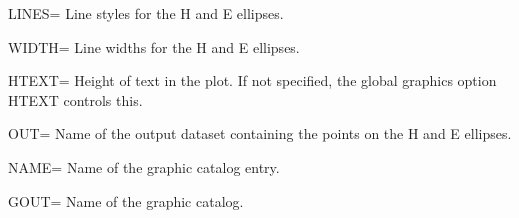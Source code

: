 \begin{proglist}
\item[LINES=] Line styles for the H and E ellipses. 

\item[WIDTH=] Line widths for the H and E ellipses. 

\item[HTEXT=] Height of text in the plot.  If not specified, the global
graphics option HTEXT controls this.

\item[OUT=] Name of the output dataset containing the points on the
H and E ellipses. 

\item[NAME=] Name of the graphic catalog entry. 

\item[GOUT=] Name of the graphic catalog. 

\end{proglist}
